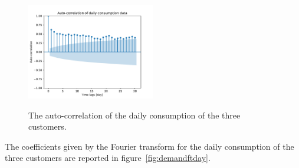 \begin{figure}[H]
\begin{minipage}[b]{17cm}
\centering
\includegraphics[width=0.5\textwidth]{images/baseline/daily_aggregated_correlation_customer3}
\label{fig:correlationdaycustomer3}
\end{minipage}
\label{fig:correlationdaycustomer}
\caption{The auto-correlation of the daily consumption of the three customers.}
\end{figure}

The coefficients given by the Fourier transform for the daily consumption of the three customers are reported in figure~\ref{fig:demandftday}. %

